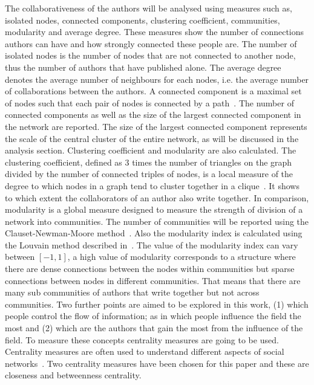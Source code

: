 The collaborativeness of the authors will be analysed using measures such as, isolated nodes,
connected components, clustering coefficient, communities, modularity and average degree.
These measures show the number of connections authors can have
and how strongly connected these people are. The number of isolated nodes is the
number of nodes that are not connected to another node, thus the
number of authors that have published alone. The average degree denotes the average
number of neighbours for each nodes, i.e. the average number of collaborations
between the authors.
A connected component is a maximal set of nodes such that each pair of nodes is
connected by a path~\cite{Easley2010}. The number of connected components as well as the size of the
largest connected component in the network are reported.
The size of the largest connected component represents the scale of the central cluster
of the entire network, as will be discussed in the analysis section.
Clustering coefficient and modularity are also calculated. The clustering
coefficient, defined as 3 times the number of triangles on the graph divided
by the number of connected triples of nodes, is a local measure of the degree to
which nodes in a graph tend to cluster together
in a clique~\cite{Easley2010}. It shows to which extent the collaborators
of an author also write together.
In comparison, modularity is a global measure designed to measure the strength of
division of a network into communities. The number of communities will be reported
using the Clauset-Newman-Moore method~\cite{clauset2004}. Also the modularity index
is calculated using the Louvain method described in~\cite{Blondel2008}. The value
of the modularity index can vary between \([-1, 1]\), a high value of modularity
corresponds to a structure where there are dense connections between the nodes within
communities but sparse connections between nodes in different communities.
That means that there are many sub communities of authors that write together
but not across communities.
Two further points are aimed to be explored in this work, (1) which people control the flow
of information;
as in which people influence the field the most and (2) which are the authors that
gain the most from the influence of the field. To measure these concepts
centrality measures are going to be used.
Centrality measures are often used to understand different
aspects of social networks~\cite{Landherr2010}. Two centrality measures have been
chosen for this paper and these are closeness and betweenness centrality.

